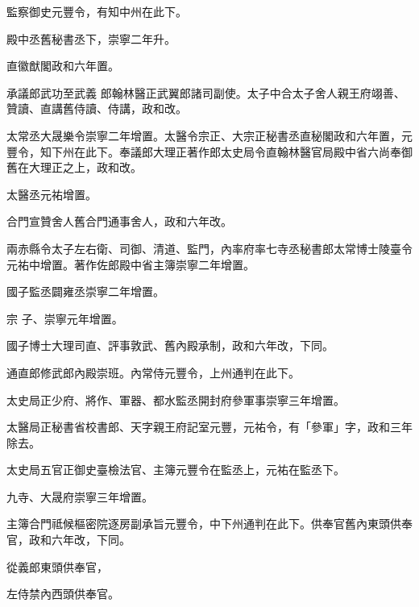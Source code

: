 \begin{pinyinscope}
 監察御史元豐令，有知中州在此下。



 殿中丞舊秘書丞下，崇寧二年升。



 直徽猷閣政和六年置。



 承議郎武功至武義
 郎翰林醫正武翼郎諸司副使。太子中合太子舍人親王府翊善、贊讀、直講舊侍讀、侍講，政和改。



 太常丞大晟樂令崇寧二年增置。太醫令宗正、大宗正秘書丞直秘閣政和六年置，元豐令，知下州在此下。奉議郎大理正著作郎太史局令直翰林醫官局殿中省六尚奉御舊在大理正之上，政和改。



 太醫丞元祐增置。



 合門宣贊舍人舊合門通事舍人，政和六年改。



 兩赤縣令太子左右衛、司御、清道、監門，內率府率七寺丞秘書郎太常博士陵臺令元祐中增置。著作佐郎殿中省主簿崇寧二年增置。



 國子監丞闢雍丞崇寧二年增置。



 宗
 子、崇寧元年增置。



 國子博士大理司直、評事敦武、舊內殿承制，政和六年改，下同。



 通直郎修武郎內殿崇班。內常侍元豐令，上州通判在此下。



 太史局正少府、將作、軍器、都水監丞開封府參軍事崇寧三年增置。



 太醫局正秘書省校書郎、天字親王府記室元豐，元祐令，有「參軍」字，政和三年除去。



 太史局五官正御史臺檢法官、主簿元豐令在監丞上，元祐在監丞下。



 九寺、大晟府崇寧三年增置。



 主簿合門祗候樞密院逐房副承旨元豐令，中下州通判在此下。供奉官舊內東頭供奉官，政和六年改，下同。



 從義郎東頭供奉官，



 左侍禁內西頭供奉官。




\end{pinyinscope}
